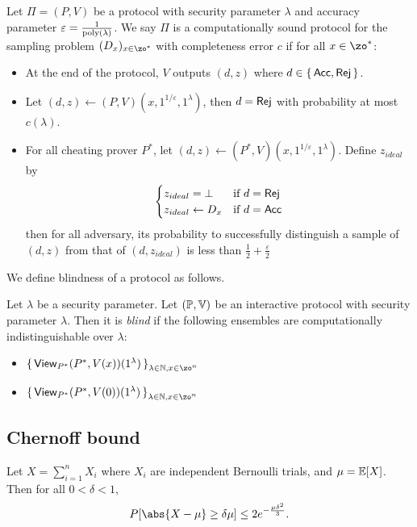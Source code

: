 \begin{definition}
	Let $\Pi=(P, V)$ be a protocol with security parameter $\lambda$ and accuracy parameter $\varepsilon=\frac{1}{\operatorname*{\operatorname{poly}}(\lambda)}$.
	We say $\Pi$ is a computationally sound protocol for the sampling problem $(D_x)_{x\in\zo^*}$ with completeness error $c$ if for all $x\in\zo^*$:
	\begin{itemize}
		\item At the end of the protocol, $V$ outputs $(d, z)$ where $d\in\set{\mathsf{Acc}, \mathsf{Rej}}$.
		\item Let $(d, z)\leftarrow(P, V)(x, 1^{1/\varepsilon}, 1^\lambda)$, then $d=\mathsf{Rej}$ with probability at most $c(\lambda)$.
		\item For all cheating prover $P^*$, let $(d, z)\leftarrow(P^*, V)(x, 1^{1/\varepsilon}, 1^\lambda)$.
			Define $z_{ideal}$ by
			$$\begin{cases}
				z_{ideal}=\bot & \text{if } d=\mathsf{Rej}\\
				z_{ideal}\leftarrow D_x & \text{if } d=\mathsf{Acc}
			\end{cases}$$
			then for all adversary, its probability to successfully distinguish a sample of $(d, z)$ from that of $(d, z_{ideal})$ is less than $\frac{1}{2}+\frac{\varepsilon}{2}$
	\end{itemize}
\end{definition}

We define blindness of a protocol as follows.

\begin{definition}
	Let $\lambda$ be a security parameter.
	Let $(\mathbb{P}, \mathbb{V})$ be an interactive protocol with security parameter $\lambda$.
	Then it is \emph{blind} if the following ensembles are computationally indistinguishable over $\lambda$:
	\begin{itemize}
		\item $\set{\View_{P^*}(P^*, V(x))(1^\lambda)}_{\lambda\in\bbN, x\in\zo^n}$
		\item $\set{\View_{P^*}(P^*, V(0))(1^\lambda)}_{\lambda\in\bbN, x\in\zo^n}$
	\end{itemize}
\end{definition}

\subsection{Chernoff bound}

\begin{thm}
\label{thm:Chernoff}
Let $X=\sum_{i=1}^n X_i$ where $X_i$ are independent Bernoulli trials, and $\mu=\operatorname*{\mathbb{E}}[X]$.
Then for all $0<\delta<1$,
$$P[\abs{X-\mu}\geq\delta\mu]\leq2e^{-\frac{\mu\delta^2}{3}}.$$
\end{thm}


